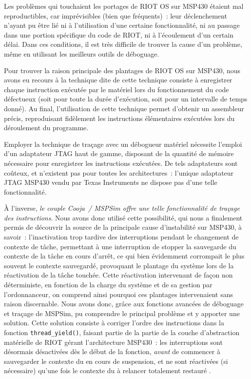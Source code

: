 \smallskip

Les problèmes qui touchaient les portages de RIOT OS sur MSP430 étaient mal
reproductibles, car imprévisibles (bien que fréquents)~: leur déclenchement
n'ayant pu être lié ni à l'utilisation d'une certaine fonctionnalité, ni au
passage dans une portion spécifique du code de RIOT, ni à l'écoulement d'un
certain délai. Dans ces conditions, il est très difficile de trouver la
cause d'un problème, même en utilisant les meilleurs outils de déboguage.

Pour trouver la raison principale des plantages de RIOT OS sur MSP430,
nous avons eu recours à la technique dite de 
cette technique consiste à enregistrer chaque instruction exécutée par
le matériel lors du fonctionnement du code défectueux (soit pour toute
la durée d'exécution, soit pour un intervalle de temps donné). Au final,
l'utilisation de cette technique permet d'obtenir un 
assembleur précis, reproduisant fidèlement les instructions élémentaires
exécutées lors du déroulement du programme.

Employer la technique de traçage avec un débogueur matériel nécessite
l'emploi d'un adaptateur JTAG haut de gamme, disposant de la quantité
de mémoire nécessaire pour enregistrer les instructions exécutées. De tels
adaptateurs sont coûteux, et n'existent pas pour toutes les architectures~:
l'unique adaptateur JTAG MSP430 vendu par Texas Instruments ne dispose pas
d'une telle fonctionnalité.

À l'inverse, \emph{le couple Cooja~/ MSPSim offre une telle fonctionnalité
de traçage des instructions}. Nous avons donc utilisé cette possibilité,
qui nous a finalement permis de découvrir la source de la principale cause
d'instabilité sur MSP430, à savoir~: l'inactivation trop tardive des
interruptions pendant le changement de contexte de tâche, permettant
à une interruption de stopper la sauvegarde du contexte de la tâche
en cours d'arrêt, ce qui bien évidemment corrompait le plus souvent
le contexte sauvegardé, provoquant le plantage du système lors de la
réactivation de la tâche touchée. Cette réactivation intervenant de façon
non déterministe, en fonction de la charge du système et de sa gestion par
l'ordonnanceur, on comprend ainsi pourquoi ces plantages intervenaient
sans raison  discernable. Nous avons donc, grâce aux
fonctions avancées de déboguage et traçage de MSPSim, pu comprendre
le principal problème et y apporter une solution. Cette solution consiste
à corriger l'ordre des instructions dans la fonction \texttt{thread\_yield()},
faisant partie de la partie de la couche d'abstraction matérielle de RIOT
gérant l'architecture MSP430~: les interruptions sont désormais désactivées
dès le début de la fonction, \emph{avant} de commencer à sauvegarder le
contexte du  en cours de suspension, et ne sont réactivées
(si nécessaire) qu'une fois le contexte du  à relancer
totalement restauré \cite{PRriotFix2MSP430}.

